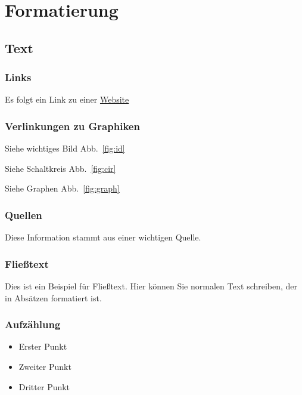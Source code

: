 \documentclass[11pt, paper=A4]{scrartcl} %
\begin{document}

\section{Formatierung}\label{formatierung} %

\subsection{Text}\label{text} %

\subsubsection{Links}\label{links} %

Es folgt ein Link zu einer \href{https://pandoc.org/}{Website}

\subsubsection{Verlinkungen zu Graphiken}\label{verlinkungen-zu-graphiken} %

Siehe wichtiges Bild Abb.~\ref{fig:id}

Siehe Schaltkreis Abb.~\ref{fig:cir}

Siehe Graphen Abb.~\ref{fig:graph}

\subsubsection{Quellen}\label{quellen} %

Diese Information stammt aus einer wichtigen Quelle.

\subsubsection{Fließtext}\label{fließtext} %

Dies ist ein Beispiel für Fließtext. Hier können Sie normalen Text schreiben, der in Absätzen formatiert ist.


\sum \neq 

\subsubsection{Aufzählung}\label{aufzählung} %

\begin{itemize}
  \item Erster Punkt
  \item Zweiter Punkt
  \item Dritter Punkt
\end{itemize}

\newpage

\AtEndDocument{\theendnotes}
\end{document}
